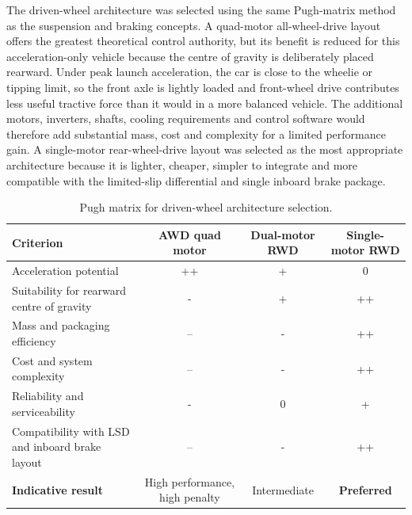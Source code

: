 The driven-wheel architecture was selected using the same Pugh-matrix method as the suspension and braking concepts. A quad-motor all-wheel-drive layout offers the greatest theoretical control authority, but its benefit is reduced for this acceleration-only vehicle because the centre of gravity is deliberately placed rearward. Under peak launch acceleration, the car is close to the wheelie or tipping limit, so the front axle is lightly loaded and front-wheel drive contributes less useful tractive force than it would in a more balanced vehicle. The additional motors, inverters, shafts, cooling requirements and control software would therefore add substantial mass, cost and complexity for a limited performance gain. A single-motor rear-wheel-drive layout was selected as the most appropriate architecture because it is lighter, cheaper, simpler to integrate and more compatible with the limited-slip differential and single inboard brake package.
\begin{table}[H]
\centering
\caption{Pugh matrix for driven-wheel architecture selection.}
\label{tab:pugh_drive_architecture}
\setlength{\tabcolsep}{3pt}
\begin{tabularx}{\linewidth}{|>{\raggedright\arraybackslash}X|c|c|c|}
\hline
\textbf{Criterion} & \textbf{AWD quad motor} & \textbf{Dual-motor RWD} & \textbf{Single-motor RWD} \\
\hline
Acceleration potential & ++ & + & 0 \\
\hline
Suitability for rearward centre of gravity & - & + & ++ \\
\hline
Mass and packaging efficiency & -- & - & ++ \\
\hline
Cost and system complexity & -- & - & ++ \\
\hline
Reliability and serviceability & - & 0 & + \\
\hline
Compatibility with LSD and inboard brake layout & -- & - & ++ \\
\hline
\textbf{Indicative result} & High performance, high penalty & Intermediate & \textbf{Preferred} \\
\hline
\end{tabularx}
\end{table}
\iffalse
